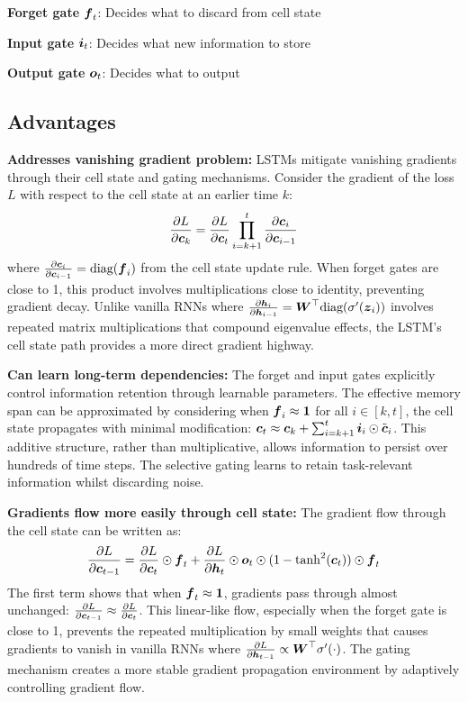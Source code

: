 \textbf{Forget gate} $\boldsymbol{f}_t$: Decides what to discard from cell state

\textbf{Input gate} $\boldsymbol{i}_t$: Decides what new information to store

\textbf{Output gate} $\boldsymbol{o}_t$: Decides what to output

\subsection{Advantages}

\textbf{Addresses vanishing gradient problem:} LSTMs mitigate vanishing gradients through their cell state and gating mechanisms. Consider the gradient of the loss $L$ with respect to the cell state at an earlier time $k$:
\begin{equation}
\frac{\partial L}{\partial \boldsymbol{c}_k} = \frac{\partial L}{\partial \boldsymbol{c}_t} \prod_{i=k+1}^{t} \frac{\partial \boldsymbol{c}_i}{\partial \boldsymbol{c}_{i-1}}
\end{equation}
where $\frac{\partial \boldsymbol{c}_i}{\partial \boldsymbol{c}_{i-1}} = \text{diag}(\boldsymbol{f}_i)$ from the cell state update rule. When forget gates are close to 1, this product involves multiplications close to identity, preventing gradient decay. Unlike vanilla RNNs where $\frac{\partial \boldsymbol{h}_i}{\partial \boldsymbol{h}_{i-1}} = \boldsymbol{W}^\top \text{diag}(\sigma'(\boldsymbol{z}_i))$ involves repeated matrix multiplications that compound eigenvalue effects, the LSTM's cell state path provides a more direct gradient highway.

\textbf{Can learn long-term dependencies:} The forget and input gates explicitly control information retention through learnable parameters. The effective memory span can be approximated by considering when $\boldsymbol{f}_i \approx \boldsymbol{1}$ for all $i \in [k, t]$, the cell state propagates with minimal modification: $\boldsymbol{c}_t \approx \boldsymbol{c}_k + \sum_{i=k+1}^{t} \boldsymbol{i}_i \odot \tilde{\boldsymbol{c}}_i$. This additive structure, rather than multiplicative, allows information to persist over hundreds of time steps. The selective gating learns to retain task-relevant information whilst discarding noise.

\textbf{Gradients flow more easily through cell state:} The gradient flow through the cell state can be written as:
\begin{equation}
\frac{\partial L}{\partial \boldsymbol{c}_{t-1}} = \frac{\partial L}{\partial \boldsymbol{c}_t} \odot \boldsymbol{f}_t + \frac{\partial L}{\partial \boldsymbol{h}_t} \odot \boldsymbol{o}_t \odot (1 - \tanh^2(\boldsymbol{c}_t)) \odot \boldsymbol{f}_t
\end{equation}
The first term shows that when $\boldsymbol{f}_t \approx \boldsymbol{1}$, gradients pass through almost unchanged: $\frac{\partial L}{\partial \boldsymbol{c}_{t-1}} \approx \frac{\partial L}{\partial \boldsymbol{c}_t}$. This linear-like flow, especially when the forget gate is close to 1, prevents the repeated multiplication by small weights that causes gradients to vanish in vanilla RNNs where $\frac{\partial L}{\partial \boldsymbol{h}_{t-1}} \propto \boldsymbol{W}^\top \sigma'(\cdot)$. The gating mechanism creates a more stable gradient propagation environment by adaptively controlling gradient flow.

